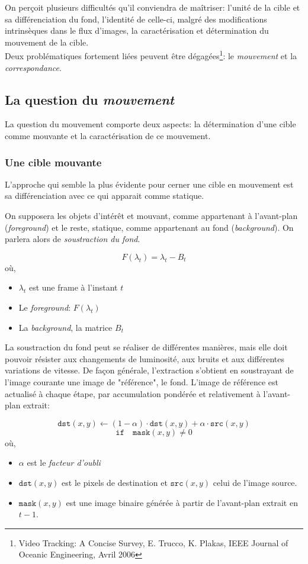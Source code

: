 \documentclass[a4paper,11pt]{report}
\begin{document}
On perçoit plusieurs difficultés qu'il conviendra de maîtriser: l'unité de la cible et sa différenciation du fond, l'identité de celle-ci, malgré des modifications intrinsèques dans le flux d'images, la caractérisation et détermination du mouvement de la cible.\\
Deux problématiques fortement liées peuvent être dégagées\footnote{Video Tracking: A Concise Survey, E. Trucco, K. Plakas, IEEE Journal of Oceanic Engineering, Avril 2006}: le \textit{mouvement} et la \textit{correspondance}.

\subsection{La question du \textit{mouvement}}

	La question du mouvement comporte deux aspects: la détermination d'une cible comme mouvante et la caractérisation de ce mouvement.
	
\subsubsection{Une cible mouvante}	
	L'approche qui semble la plus évidente pour cerner une cible en mouvement est sa différenciation avec ce qui apparait comme statique. 
	
	On supposera les objets d'intérêt et mouvant, comme appartenant à l'avant-plan (\textit{foreground}) et le reste, statique, comme appartenant au fond (\textit{background}). On parlera alors de \textit{soustraction du fond}.

\[F(\lambda_t) = \lambda_t - B_t\]	
où,
\begin{itemize}
\item[] $\lambda_t$ est une frame à l'instant $t$
\item[] Le \textit{foreground}: $F(\lambda_t)$ 
\item[] La \textit{background}, la matrice $B_t$\\
\end{itemize}

	La soustraction du fond peut se réaliser de différentes manières, mais elle doit pouvoir résister aux changements de luminosité, aux bruits et aux différentes variations de vitesse.
	De façon générale, l'extraction s'obtient en soustrayant de l'image courante une image de "référence", le fond.
	L'image de référence est actualisé à chaque étape, par accumulation pondérée et relativement à l'avant-plan extrait:
	
	$$\texttt{dst}(x,y)  \leftarrow (1- \alpha )  \cdot \texttt{dst}(x,y)+\alpha \cdot \texttt{src}(x,y)$$
	$$\texttt{if} \quad \texttt{mask} (x,y)  \ne 0$$
	où,	
	\begin{itemize}
	\item[] $\alpha$ est le \textit{facteur d'oubli}
	\item[] $\texttt{dst}(x,y)$ est le pixels de destination et $\texttt{src}(x,y)$ celui de l'image source.
	\item[] $\texttt{mask} (x,y)$ est une image binaire générée à partir de l'avant-plan extrait en $t-1$.
	\end{itemize}
\end{document}
